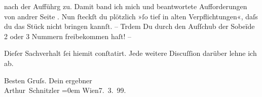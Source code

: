                nach der Aufführg zu. Damit band ich mich und beantwortete Aufforderungen von andrer
               Seite \label{K_L00899-2v}\label{K_L00899-2}. Nun{ }ſteckſt du plötzlich »ſo tief in alten Verpflichtungen«, daſs du das Stück {\pb}nicht bringen kannſt. –
                  Trdem Du durch den Aufſchub der Sobeïde 2
               oder 3 Nummern freibekommen haſt! –\pend
           
\pstart
           Dieſer Sachverhalt{ }ſei hiemit conſtatirt. Jede weitere Discuſſion darüber lehne ich
               ab.\pend
           
\pstart
           Besten Gruſs. Dein ergebner{\\[\baselineskip]}\spacefill\mbox{Arthur Schnitzler}\pend
           \leftskip=0em{}
\pstart
           Wien7. 3. 99.\pend
           \endnumbering{}  \newcommand{\dateiname}{L00899}\newcommand{\titel}{Arthur Schnitzler an Hermann Bahr, 7. 3. 1899}\newcommand{\editorInnen}{Herausgegeben von Martin Anton Müller}
